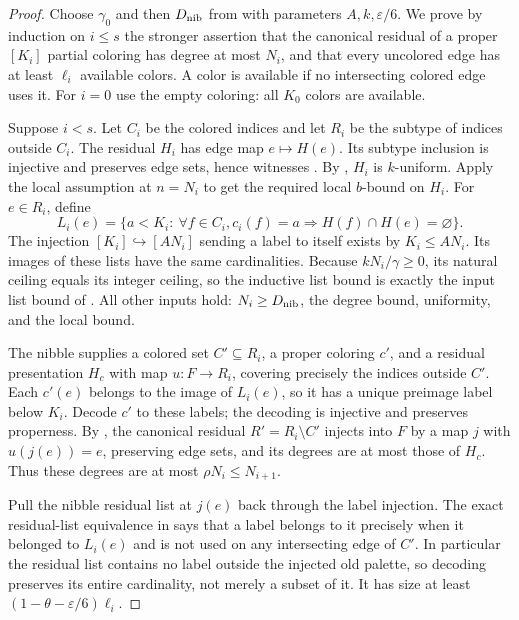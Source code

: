\begin{proof}
Choose $\gamma_0$ and then $D_{\rm nib}$ from
 with parameters $A,k,\varepsilon/6$.
We prove by induction on $i\le s$ the stronger assertion that the
canonical residual of a proper $[K_i]$ partial coloring has degree at
most $N_i$, and that every uncolored edge has at least $\ell_i$ available
colors. A color is available if no intersecting colored edge uses it.
For $i=0$ use the empty coloring: all $K_0$ colors are available.

Suppose $i<s$. Let $C_i$ be the colored indices and let $R_i$ be the
subtype of indices outside $C_i$. The residual $H_i$ has edge map
$e\mapsto H(e)$. Its subtype inclusion is injective and preserves edge
sets, hence witnesses .
By , $H_i$ is $k$-uniform.
Apply the local assumption at $n=N_i$ to get the required local
$b$-bound on $H_i$.
For $e\in R_i$, define
\[
L_i(e)=\{a<K_i:\ \forall f\in C_i,
 c_i(f)=a\Longrightarrow H(f)\cap H(e)=\varnothing\}.
\]
The injection $[K_i]\hookrightarrow[AN_i]$ sending a label to itself
exists by $K_i\le AN_i$. Its images of these lists have the same
cardinalities. Because $kN_i/\gamma\ge0$, its natural ceiling equals
its integer ceiling, so the inductive list bound is exactly the input
list bound of . All other inputs hold:
$N_i\ge D_{\rm nib}$, the degree bound, uniformity, and the local bound.

The nibble supplies a colored set $C'\subseteq R_i$, a proper coloring
$c'$, and a residual presentation $H_c$ with map $u:F\to R_i$,
covering precisely the indices outside $C'$. Each $c'(e)$ belongs to the
image of $L_i(e)$, so it has a unique preimage label below $K_i$.
Decode $c'$ to these labels; the decoding is injective and preserves
properness. By , the canonical
residual $R'=R_i\setminus C'$ injects into $F$ by a map $j$ with
$u(j(e))=e$, preserving edge sets, and its degrees are at most those of
$H_c$. Thus these degrees are at most $\rho N_i\le N_{i+1}$.

Pull the nibble residual list at $j(e)$ back through the label injection.
The exact residual-list equivalence in 
says that a label belongs to it precisely when it belonged to $L_i(e)$
and is not used on any intersecting edge of $C'$. In particular the
residual list contains no label outside the injected old palette, so
decoding preserves its entire cardinality, not merely a subset of it.
It has size at least $(1-\theta-\varepsilon/6)\ell_i$.


\end{proof}
